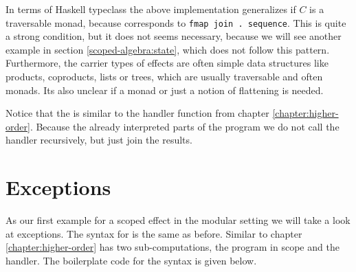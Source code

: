In terms of Haskell typeclass the above implementation generalizes if $C$ is a
traversable monad, because  corresponds to
\texttt{fmap join . sequence}.
This is quite a strong condition, but it does not seems necessary, because we
will see another example in section \ref{scoped-algebra:state}, which does not
follow this pattern.
Furthermore, the carrier types of effects are often simple data structures like
products, coproducts, lists or trees, which are usually traversable and often
monads.
Its also unclear if a monad or just a notion of flattening is needed.

Notice that the  is similar to the handler function from
chapter \ref{chapter:higher-order}.
Because the  already interpreted parts of the program we do
not call the handler recursively, but just join the results.


\section{Exceptions}

As our first example for a scoped effect in the modular setting we will take a
look at exceptions.
The syntax for  is the same as before.
Similar to chapter \ref{chapter:higher-order}  has two
sub-computations, the program in scope and the handler.
The boilerplate code for the syntax is given below.


